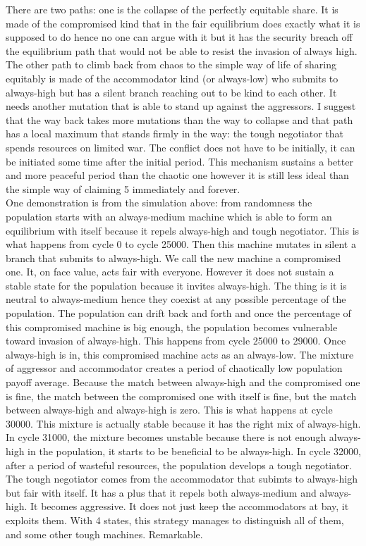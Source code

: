 \documentclass[12.5pt]{report}
\begin{document}
There are two paths: one is the collapse of the perfectly equitable share. It is made of the compromised kind that in the fair equilibrium does exactly what it is supposed to do hence no one can argue with it but it has the security breach off the equilibrium path that would not be able to resist the invasion of always high. The other path to climb back from chaos to the simple way of life of sharing equitably is made of the accommodator kind (or always-low) who submits to always-high but has a silent branch reaching out to be kind to each other. It needs another mutation that is able to stand up against the aggressors. I suggest that the way back takes more mutations than the way to collapse and that path has a local maximum that stands firmly in the way: the tough negotiator that spends resources on limited war. The conflict does not have to be initially, it can be initiated some time after the initial period. This mechanism sustains a better and more peaceful period than the chaotic one however it is still less ideal than the simple way of claiming 5 immediately and forever.\\

One demonstration is from the simulation above: from randomness the population starts with an always-medium machine which is able to form an equilibrium with itself because it repels always-high and tough negotiator. This is what happens from cycle 0 to cycle 25000. Then this machine mutates in silent a branch that submits to always-high. We call the new machine a compromised one. It, on face value, acts fair with everyone. However it does not sustain a stable state for the population because it invites always-high. The thing is it is neutral to always-medium hence they coexist at any possible percentage of the population. The population can drift back and forth and once the percentage of this compromised machine is big enough, the population becomes vulnerable toward invasion of always-high. This happens from cycle 25000 to 29000. Once always-high is in, this compromised machine acts as an always-low. The mixture of aggressor and accommodator creates a period of chaotically low population payoff average. Because the match between always-high and the compromised one is fine, the match between the compromised one with itself is fine, but the match between always-high and always-high is zero. This is what happens at cycle 30000. This mixture is actually stable because it has the right mix of always-high. In cycle 31000, the mixture becomes unstable because there is not enough always-high in the population, it starts to be beneficial to be always-high. In cycle 32000, after a period of wasteful resources, the population develops a tough negotiator. The tough negotiator comes from the accommodator that subimts to always-high but fair with itself. It has a plus that it repels both always-medium and always-high. It becomes aggressive. It does not just keep the accommodators at bay, it exploits them. With 4 states, this strategy manages to distinguish all of them, and some other tough machines. Remarkable.\\
\end{document}
